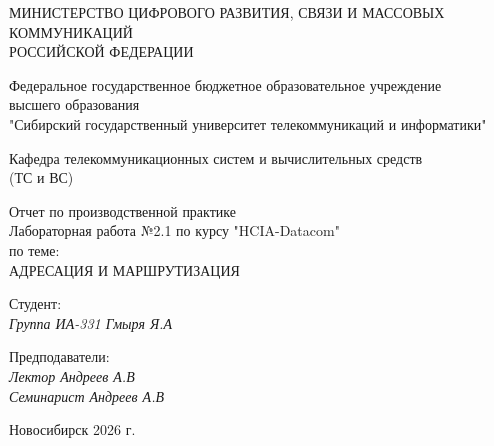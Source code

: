 \thispagestyle{empty}

\begin{center}
    МИНИСТЕРСТВО ЦИФРОВОГО РАЗВИТИЯ, СВЯЗИ И МАССОВЫХ КОММУНИКАЦИЙ \\ РОССИЙСКОЙ ФЕДЕРАЦИИ

    \vspace{20pt}

    Федеральное государственное бюджетное образовательное учреждение  \\  высшего образования \\
    "Сибирский государственный университет телекоммуникаций и информатики" \\

    \vspace{20pt}

    Кафедра телекоммуникационных систем и вычислительных средств \\  (ТС и ВС)
\end{center}

\vfill

\begin{center}
    Отчет по производственной практике \\  
    Лабораторная работа №2.1 по курсу "HCIA-Datacom"\\
    \vspace{20pt}
    по теме: \\
    \uppercase{Адресация и маршрутизация}
\end{center}

\vfill

    \noindent Студент: \\
    \textit{Группа ИА-331 \hfill Гмыря Я.А} 

    \vspace{20pt}
 
    \noindent Предподаватели: \\
    \textit{Лектор \hfill Андреев А.В} \\
    \textit{Семинарист \hfill Андреев А.В}

\vfill

\begin{center}
    Новосибирск 2026 г.
\end{center}
